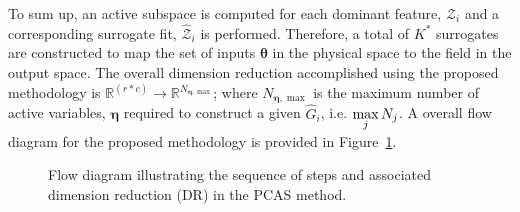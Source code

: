 To sum up, an active subspace is computed for each dominant feature, $\mathcal{Z}_i$ and a corresponding
surrogate fit, $\hat{\mathcal{Z}}_i$ is performed. Therefore, a total of $K^\ast$ surrogates are constructed
to map the set of inputs $\bm{\theta}$ in the physical space to the field in the output space. The overall dimension
reduction accomplished using the proposed methodology is $\mathbb{R}^{(r\ast c)}\rightarrow \mathbb{R}^{N_{\bm{\eta},
\max}}$; where $N_{\bm{\eta},\max}$ is the maximum number of active variables, $\bm{\eta}$ required to construct
a given $\hat{G}_i$, i.e. $\max\limits_j {N_j}$. A overall flow diagram for the proposed methodology is provided in 
Figure~\ref{fig:fd}.
%
\begin{figure}[htbp]
\begin{center}
\end{center}
\caption{Flow diagram illustrating the sequence of steps and associated dimension reduction (DR) in the PCAS method.}
\label{fig:fd}
\end{figure}
